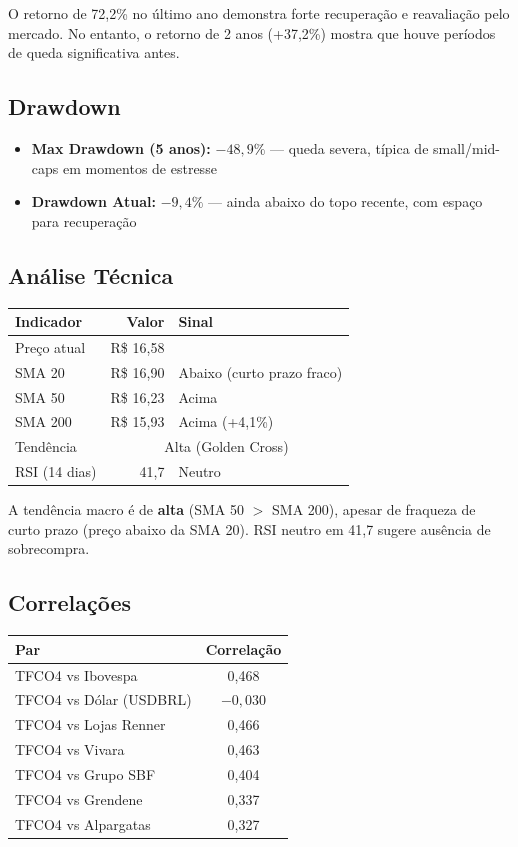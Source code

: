 \documentclass[12pt, a4paper]{article}
\begin{document}
O retorno de 72,2\% no último ano demonstra forte recuperação e reavaliação pelo mercado. No entanto, o retorno de 2 anos (+37,2\%) mostra que houve períodos de queda significativa antes.

\subsection{Drawdown}

\begin{itemize}[leftmargin=*]
    \item \textbf{Max Drawdown (5 anos):} $-48,9\%$ --- queda severa, típica de small/mid-caps em momentos de estresse
    \item \textbf{Drawdown Atual:} $-9,4\%$ --- ainda abaixo do topo recente, com espaço para recuperação
\end{itemize}

\subsection{Análise Técnica}

\begin{center}
\begin{tabular}{lrl}
\toprule
\textbf{Indicador} & \textbf{Valor} & \textbf{Sinal} \\
\midrule
Preço atual & R\$ 16,58 & \\
SMA 20 & R\$ 16,90 & Abaixo (curto prazo fraco) \\
SMA 50 & R\$ 16,23 & Acima \\
SMA 200 & R\$ 15,93 & Acima (+4,1\%) \\
\midrule
Tendência & \multicolumn{2}{c}{Alta (Golden Cross)} \\
RSI (14 dias) & 41,7 & Neutro \\
\bottomrule
\end{tabular}
\end{center}

A tendência macro é de \textbf{alta} (SMA 50 $>$ SMA 200), apesar de fraqueza de curto prazo (preço abaixo da SMA 20). RSI neutro em 41,7 sugere ausência de sobrecompra.

\subsection{Correlações}

\begin{center}
\begin{tabular}{lc}
\toprule
\textbf{Par} & \textbf{Correlação} \\
\midrule
TFCO4 vs Ibovespa & 0,468 \\
TFCO4 vs Dólar (USDBRL) & $-0,030$ \\
TFCO4 vs Lojas Renner & 0,466 \\
TFCO4 vs Vivara & 0,463 \\
TFCO4 vs Grupo SBF & 0,404 \\
TFCO4 vs Grendene & 0,337 \\
TFCO4 vs Alpargatas & 0,327 \\
\bottomrule
\end{tabular}
\end{center}
\end{document}
